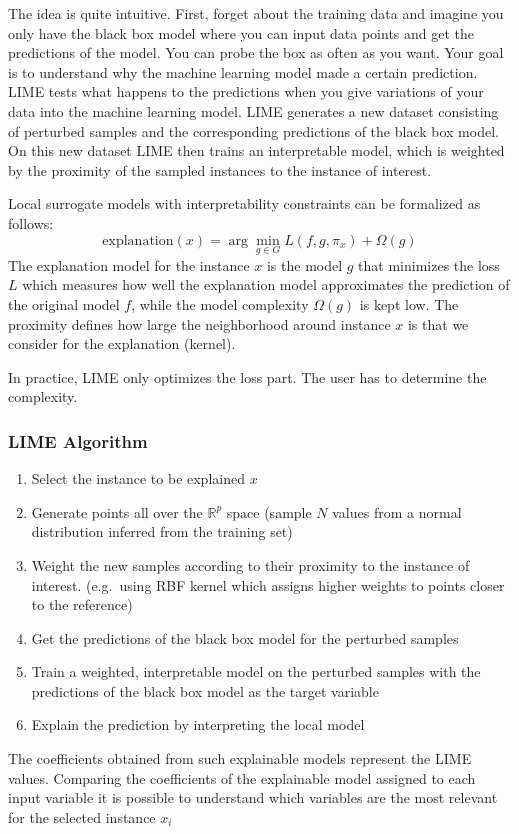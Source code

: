 The idea is quite intuitive. First, forget about the training data and imagine you only have the black box model where you can input data points and get the predictions of the model. 
You can probe the box as often as you want. Your goal is to understand why the machine learning model made a certain prediction. LIME tests what happens to the predictions when you give variations of your data into the machine learning model. 
LIME generates a new dataset consisting of perturbed samples and the corresponding predictions of the black box model. On this new dataset LIME then trains an interpretable model, which is weighted by the proximity of the sampled instances to the instance of interest.

Local surrogate models with interpretability constraints can be formalized as follows:
\begin{equation*}
    \text{explanation}(x)=\arg\min_{g\in{}G}L(f,g,\pi_x)+\Omega(g)
\end{equation*}
The explanation model for the instance $x$ is the model $g$ that minimizes the loss $L$ which measures how well the explanation model approximates the prediction of the original model $f$, while the model complexity $\Omega(g)$ is kept low.
The proximity defines how large the neighborhood around instance $x$ is that we consider for the explanation (kernel).

In practice, LIME only optimizes the loss part. The user has to determine the complexity.

\subsubsection{LIME Algorithm}
\begin{enumerate}
    \item Select the instance to be explained $x$
    \item Generate points all over the $\mathbb{R}^p$ space (sample $N$ values from a normal distribution inferred from the training set)
    \item Weight the new samples according to their proximity to the instance of interest. (e.g.\ using RBF kernel which assigns higher weights to points closer to the reference)
    \item Get the predictions of the black box model for the perturbed samples
    \item Train a weighted, interpretable model on the perturbed samples with the predictions of the black box model as the target variable
    \item Explain the prediction by interpreting the local model
\end{enumerate}
The coefficients obtained from such explainable models represent the LIME values. Comparing the coefficients of the explainable model assigned to each input variable it is
possible to understand which variables are the most relevant for the selected instance $x_i$

